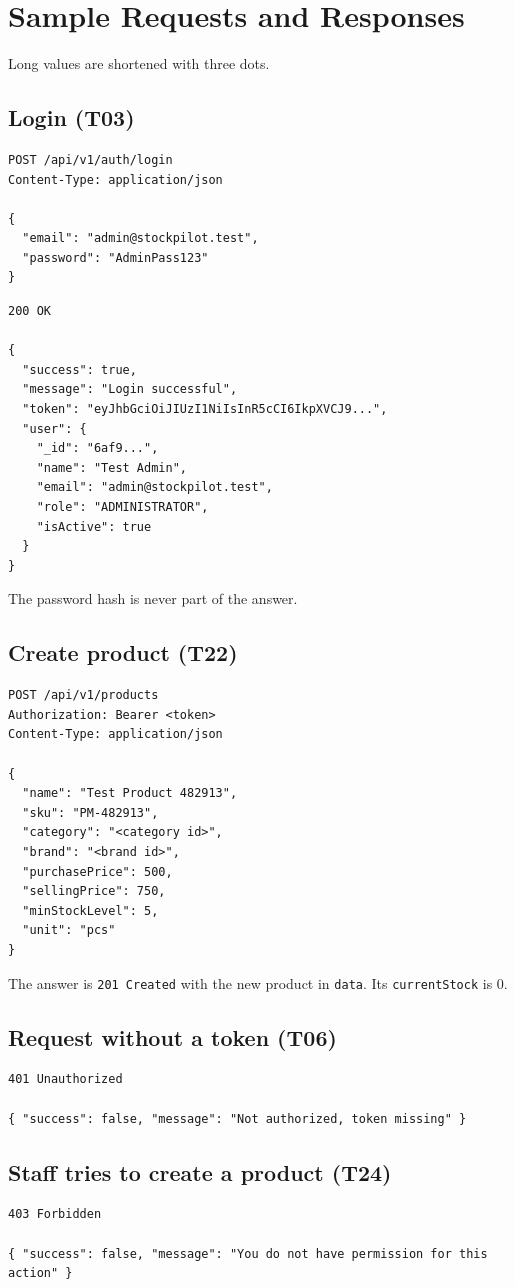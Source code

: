 \documentclass[11pt,a4paper]{article}
\newcommand{\code}[1]{\texttt{#1}}
\begin{document}
\section{Sample Requests and Responses}
Long values are shortened with three dots.

\subsection*{Login (T03)}
\begin{lstlisting}[style=query]
POST /api/v1/auth/login
Content-Type: application/json

{
  "email": "admin@stockpilot.test",
  "password": "AdminPass123"
}
\end{lstlisting}
\begin{lstlisting}[style=result]
200 OK

{
  "success": true,
  "message": "Login successful",
  "token": "eyJhbGciOiJIUzI1NiIsInR5cCI6IkpXVCJ9...",
  "user": {
    "_id": "6af9...",
    "name": "Test Admin",
    "email": "admin@stockpilot.test",
    "role": "ADMINISTRATOR",
    "isActive": true
  }
}
\end{lstlisting}
The password hash is never part of the answer.

\subsection*{Create product (T22)}
\begin{lstlisting}[style=query]
POST /api/v1/products
Authorization: Bearer <token>
Content-Type: application/json

{
  "name": "Test Product 482913",
  "sku": "PM-482913",
  "category": "<category id>",
  "brand": "<brand id>",
  "purchasePrice": 500,
  "sellingPrice": 750,
  "minStockLevel": 5,
  "unit": "pcs"
}
\end{lstlisting}
The answer is \code{201 Created} with the new product in \code{data}. Its \code{currentStock} is 0.

\subsection*{Request without a token (T06)}
\begin{lstlisting}[style=result]
401 Unauthorized

{ "success": false, "message": "Not authorized, token missing" }
\end{lstlisting}

\subsection*{Staff tries to create a product (T24)}
\begin{lstlisting}[style=result]
403 Forbidden

{ "success": false, "message": "You do not have permission for this action" }
\end{lstlisting}
\end{document}
